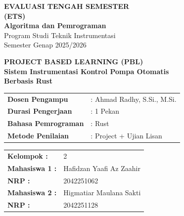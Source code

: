 \documentclass[12pt,a4paper]{article}
\begin{document}
\begin{titlepage}
    \centering
    
    {\LARGE \textbf{EVALUASI TENGAH SEMESTER}} \\[0.2cm]
    {\LARGE \textbf{(ETS)}} \\[0.5cm]
    
    {\Large \textbf{Algoritma dan Pemrograman}} \\[0.8cm]
    
    {\large Program Studi Teknik Instrumentasi} \\[0.2cm]
    {\large Semester Genap 2025/2026} \\[1.5cm]
    
    \begin{tcolorbox}[
        colback=boxblue, 
        colframe=borderblue, 
        width=0.9\textwidth, 
        arc=5pt, 
        boxrule=1pt,
        center title,
        halign=center
    ]
        \centering
        \textbf{\large PROJECT BASED LEARNING (PBL)} \\[0.3cm]
        \textbf{Sistem Instrumentasi Kontrol Pompa Otomatis \\ Berbasis Rust}
    \end{tcolorbox}
    
    \vfill 
    
    \begin{flushleft}
    \hspace{2.5cm} 
    \begin{tabular}{ll}
        \textbf{Dosen Pengampu}  & : Ahmad Radhy, S.Si., M.Si. \\
        \textbf{Durasi Pengerjaan} & : 1 Pekan \\
        \textbf{Bahasa Pemrograman} & : Rust \\
        \textbf{Metode Penilaian}  & : Project + Ujian Lisan \\
    \end{tabular}
    \end{flushleft}
    
    \vspace{1.5cm}
    
    \begin{flushleft}
    \hspace{2.5cm}
    \begin{tabular}{ll}
        \textbf{Kelompok :} & 2 \\[0.3cm] 
        \textbf{Mahasiswa 1 :} & Hafidzan Yaafi Az Zaahir \\[0.1cm]
        \textbf{NRP :} & 2042251062 \\[0.3cm]
        \textbf{Mahasiswa 2 :} & Higmatiar Maulana Sakti \\[0.1cm]
        \textbf{NRP :} & 2042251128 \\
    \end{tabular}
    \end{flushleft}
    

\end{titlepage}
\end{document}

